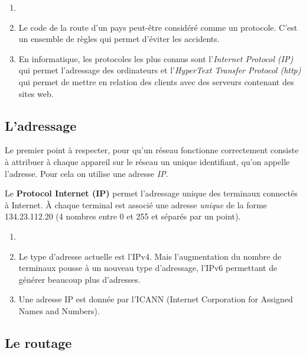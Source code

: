 \documentclass[11pt, a4paper]{book}
\begin{document}
\begin{remarques}
\begin{enumerate}
\item[]
\item Le code de la route d'un pays peut-être considéré comme un protocole. C'est un ensemble de règles qui permet d'éviter les accidents.
\item En informatique, les protocoles les plus connus sont l'{\it Internet Protocol (IP)} qui permet l'adressage des ordinateurs et l'{\it HyperText Transfer Protocol (http)} qui permet de mettre en relation des clients avec des serveurs contenant des sites web.

\end{enumerate}

\end{remarques}


\subsection{L'adressage}

Le premier point à respecter, pour qu'un réseau fonctionne correctement consiste à attribuer à chaque appareil sur le réseau un unique identifiant, qu'on appelle l'adresse. Pour cela on utilise une adresse {\it IP}. 

\begin{defi}
Le {\bf Protocol Internet (IP)} permet l'adressage unique des terminaux connectés à Internet. À chaque terminal est associé une adresse {\it unique} de la forme 134.23.112.20 (4 nombres entre 0 et 255 et séparés par un point). 
\end{defi} 


\begin{remarques}
\begin{enumerate}
\item[]
\item Le type d'adresse actuelle est l'IPv4. Mais l'augmentation du nombre de terminaux pousse à un nouveau type d'adressage, l'IPv6 permettant de générer beaucoup plus d'adresses.
\item Une adresse IP est donnée par l'ICANN (Internet Corporation for Assigned Names and Numbers).
\end{enumerate}
\end{remarques}


\subsection{Le routage}
\end{document}

